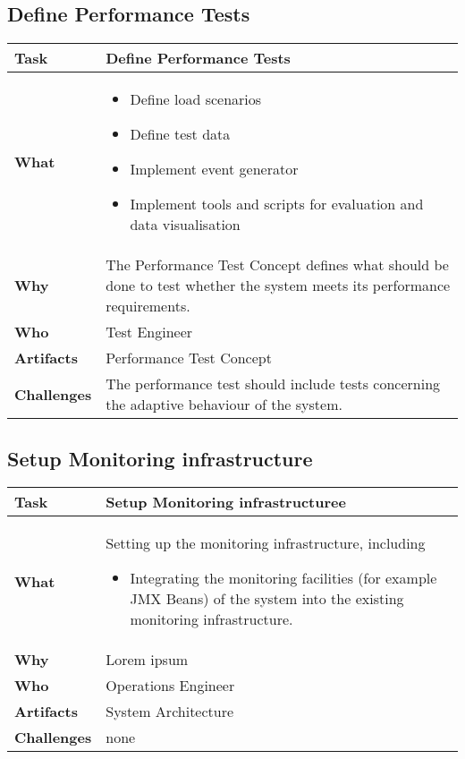 \subsection{Define Performance Tests}
\begin{tabularx}{\textwidth}{@{} l X @{}}
	\caption{Define Performance Tests} \label{table:ch6_Task_Define_Performance_Tests}\\
	\toprule 
	\bfseries Task & Define Performance Tests\\
	\midrule 
	\bfseries What &
	\begin{itemize}
		\item Define load scenarios
		\item Define test data
		\item Implement event generator
		\item Implement tools and scripts for evaluation and data visualisation
	\end{itemize}
	\\
	\midrule 
	\bfseries Why & The Performance Test Concept defines what should be done to test whether the system meets its performance requirements.\\
	\midrule 
	\bfseries Who & Test Engineer\\
	\midrule 
	\bfseries Artifacts & Performance Test Concept\\
	\midrule 
	\bfseries Challenges & The performance test should include tests concerning the adaptive behaviour of the system.\\
	\bottomrule 
\end{tabularx}


\subsection{Setup Monitoring infrastructure}
\begin{tabularx}{\textwidth}{@{} l X @{}}
	\caption{Setup Monitoring infrastructure} \label{table:ch6_Task_Setup_Monitoring_infrastructure}\\
	\toprule 
	\bfseries Task & Setup Monitoring infrastructuree\\
	\midrule 
	\bfseries What & Setting up the monitoring infrastructure, including
	\begin{itemize}
		\item Integrating the monitoring facilities (for example \ac{JMX} Beans) of the system into the existing monitoring infrastructure.
	\end{itemize}
	\\
	\midrule 
	\bfseries Why & Lorem ipsum\\
	\midrule 
	\bfseries Who & Operations Engineer\\
	\midrule 
	\bfseries Artifacts & System Architecture\\
	\midrule 
	\bfseries Challenges & none\\
	\bottomrule 
\end{tabularx}


